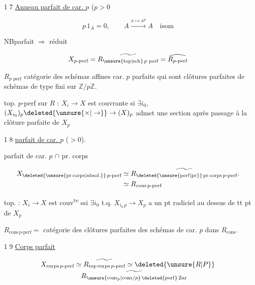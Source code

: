 
\textcircled{17} \uline{Anneau parfait de car. $p$} ($p>0$

\[
 p\,1_A=0,\qquad A\xrightarrow{x\mapsto x^p}A\quad\text{isom}
\]


NB\quad parfait $\Longrightarrow$ réduit

\[
 X_{p\text{-perf}}=\widetilde{R_{\unsure{\mathrm{top}|\mathrm{sch}}\,p\text{ perf}}}
 =\widehat{R_{p\text{-perf}}}
\]

$R_{p\text{ perf}}$ catégorie des schémas affines  car. $p$ parfaits qui sont clôtures parfaites de schémas de type fini sur $\mathbb Z/p\mathbb Z$.

top. $p$-perf sur $R$ : $X_i\longrightarrow X$ est couvrante si $\exists i_0$, $(X_{i_0})_p\deleted{\ensuremath{\unsure{\times|\to}}}\to(X)_p$ admet une section après passage à la clôture parfaite de $X_p$

\textcircled{18} \uline{  parfait de car. $p$} ($>0$).

parfait de car. $p$ $\cap$ pr. corps

\[
\begin{aligned}
 X_{\deleted{\ensuremath{\unsure{\mathrm{pr\,corps}|\mathrm{absol.}}}}\,p\text{-perf}}
 &\simeq \widetilde{R_{\deleted{\ensuremath{\unsure{\mathrm{perf}|\mathrm{pr}}}}\,\mathrm{pr\,corps}\,p\text{-perf}}}.\\
 &\simeq R_{\mathrm{cons}\,p\text{-perf}}
\end{aligned}
\]

top.  : $X_i\to X$ est couv\textsuperscript{te} ssi $\exists i_0$ t.q. $X_{i_0\,p}\longrightarrow X_p$ a un pt radiciel au dessus de tt pt de $X_p$

$R_{\mathrm{cons}\,p\text{-perf}}=$ catégorie des clôtures parfaites des schémas de car. $p$ dans $R_{\mathrm{cons}}$.

\textcircled{19} \uline{Corps parfait}  

\[
\begin{aligned}
 X_{\mathrm{corps}\,p\text{-perf}}&\simeq
 \widetilde{R_{\mathrm{top\,corps}\,p\text{-perf}}}\simeq\deleted{\ensuremath{\unsure{R|P}}}\\[-2pt]
 &\hspace{1em}\widetilde{R_{\unsure{\mathrm{cons}_p|\mathrm{cons}/p}\,\deleted{\ensuremath{\mathrm{perf}}}\,\mathrm{Zar}}}
\end{aligned}
\]

